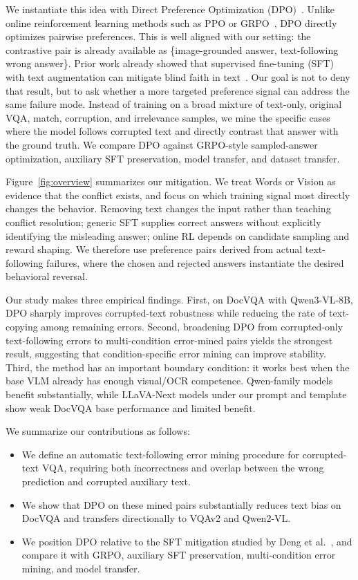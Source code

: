We instantiate this idea with Direct Preference Optimization (DPO)~\cite{rafailov2023dpo}.
Unlike online reinforcement learning methods such as PPO or GRPO~\cite{shao2024deepseekmath}, DPO directly optimizes pairwise preferences.
This is well aligned with our setting: the contrastive pair is already available as \{image-grounded answer, text-following wrong answer\}.
Prior work already showed that supervised fine-tuning (SFT) with text augmentation can mitigate blind faith in text~\cite{deng2025words}.
Our goal is not to deny that result, but to ask whether a more targeted preference signal can address the same failure mode.
Instead of training on a broad mixture of text-only, original VQA, match, corruption, and irrelevance samples, we mine the specific cases where the model follows corrupted text and directly contrast that answer with the ground truth.
We compare DPO against GRPO-style sampled-answer optimization, auxiliary SFT preservation, model transfer, and dataset transfer.

Figure~\ref{fig:overview} summarizes our mitigation.
We treat Words or Vision as evidence that the conflict exists, and focus on which training signal most directly changes the behavior.
Removing text changes the input rather than teaching conflict resolution; generic SFT supplies correct answers without explicitly identifying the misleading answer; online RL depends on candidate sampling and reward shaping.
We therefore use preference pairs derived from actual text-following failures, where the chosen and rejected answers instantiate the desired behavioral reversal.

Our study makes three empirical findings.
First, on DocVQA with Qwen3-VL-8B, DPO sharply improves corrupted-text robustness while reducing the rate of text-copying among remaining errors.
Second, broadening DPO from corrupted-only text-following errors to multi-condition error-mined pairs yields the strongest result, suggesting that condition-specific error mining can improve stability.
Third, the method has an important boundary condition: it works best when the base VLM already has enough visual/OCR competence.
Qwen-family models benefit substantially, while LLaVA-Next models under our prompt and template show weak DocVQA base performance and limited benefit.

We summarize our contributions as follows:
\begin{itemize}[leftmargin=*]
    \item We define an automatic text-following error mining procedure for corrupted-text VQA, requiring both incorrectness and overlap between the wrong prediction and corrupted auxiliary text.
    \item We show that DPO on these mined pairs substantially reduces text bias on DocVQA and transfers directionally to VQAv2 and Qwen2-VL.
    \item We position DPO relative to the SFT mitigation studied by Deng et al.~\cite{deng2025words}, and compare it with GRPO, auxiliary SFT preservation, multi-condition error mining, and model transfer.
\end{itemize}
